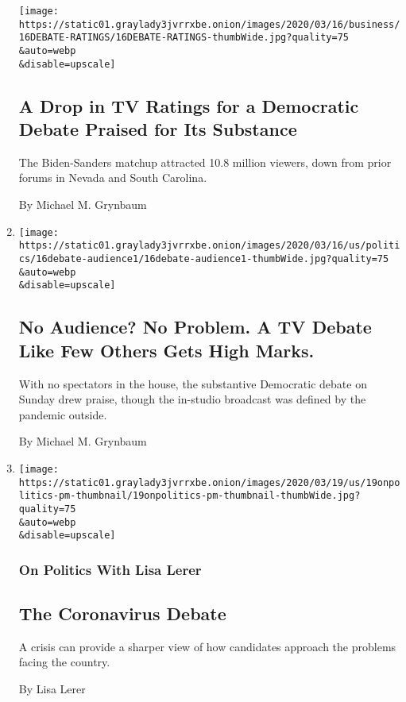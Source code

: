 \begin{enumerate}
  \texttt{[image: https://static01.graylady3jvrrxbe.onion/images/2020/03/16/business/16DEBATE-RATINGS/16DEBATE-RATINGS-thumbWide.jpg?quality=75\\\&auto=webp\\\&disable=upscale]}

  \hypertarget{a-drop-in-tv-ratings-for-a-democratic-debate-praised-for-its-substance}{%
  \subsection{A Drop in TV Ratings for a Democratic Debate Praised for
  Its
  Substance}\label{a-drop-in-tv-ratings-for-a-democratic-debate-praised-for-its-substance}}

  The Biden-Sanders matchup attracted 10.8 million viewers, down from
  prior forums in Nevada and South Carolina.

  By Michael M. Grynbaum
\item
  \href{/2020/03/16/us/elections/no-audience-cnn-democratic-debate.html}{}

  \texttt{[image: https://static01.graylady3jvrrxbe.onion/images/2020/03/16/us/politics/16debate-audience1/16debate-audience1-thumbWide.jpg?quality=75\\\&auto=webp\\\&disable=upscale]}

  \hypertarget{no-audience-no-problem-a-tv-debate-like-few-others-gets-high-marks}{%
  \subsection{No Audience? No Problem. A TV Debate Like Few Others Gets
  High
  Marks.}\label{no-audience-no-problem-a-tv-debate-like-few-others-gets-high-marks}}

  With no spectators in the house, the substantive Democratic debate on
  Sunday drew praise, though the in-studio broadcast was defined by the
  pandemic outside.

  By Michael M. Grynbaum
\item
  \href{/2020/03/16/us/politics/debate-biden-sanders.html}{}

  \texttt{[image: https://static01.graylady3jvrrxbe.onion/images/2020/03/19/us/19onpolitics-pm-thumbnail/19onpolitics-pm-thumbnail-thumbWide.jpg?quality=75\\\&auto=webp\\\&disable=upscale]}

  \hypertarget{on-politics-with-lisa-lerer}{%
  \subsubsection{On Politics With Lisa
  Lerer}\label{on-politics-with-lisa-lerer}}

  \hypertarget{the-coronavirus-debate}{%
  \subsection{The Coronavirus Debate}\label{the-coronavirus-debate}}

  A crisis can provide a sharper view of how candidates approach the
  problems facing the country.

  By Lisa Lerer
\end{enumerate}


